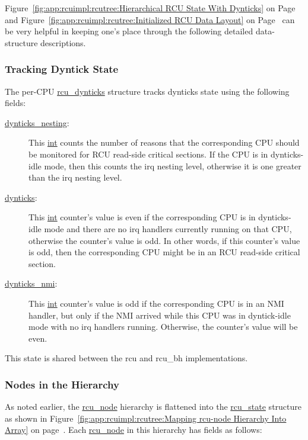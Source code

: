 Figure~\ref{fig:app:rcuimpl:rcutree:Hierarchical RCU State With Dynticks}
on
Page~\pageref{fig:app:rcuimpl:rcutree:Hierarchical RCU State With Dynticks}
and
Figure~\ref{fig:app:rcuimpl:rcutree:Initialized RCU Data Layout}
on
Page~\pageref{fig:app:rcuimpl:rcutree:Initialized RCU Data Layout}
can be very helpful in keeping one's place through the following detailed
data-structure descriptions.

\subsubsection{Tracking Dyntick State}
\label{app:rcuimpl:rcutreewt:Tracking Dyntick State}

The per-CPU \url{rcu_dynticks} structure tracks dynticks state using the
following fields:

\begin{description}
\item[\url{dynticks_nesting}:]
	This \url{int} counts the number of reasons that the corresponding
	CPU should be monitored for RCU read-side critical sections.
	If the CPU is in dynticks-idle mode, then this counts the
	irq nesting level, otherwise it is one greater than the
	irq nesting level.
\item[\url{dynticks}:]
	This \url{int} counter's value is even if the corresponding CPU is
	in dynticks-idle mode and there are no irq handlers currently
	running on that CPU, otherwise the counter's value is odd.
	In other words, if this counter's value is odd, then the
	corresponding CPU might be in an RCU read-side critical section.
\item[\url{dynticks_nmi}:]
	This \url{int} counter's value is odd if the corresponding CPU is
	in an NMI handler, but only if the NMI arrived while this
	CPU was in dyntick-idle mode with no irq handlers running.
	Otherwise, the counter's value will be even.
\end{description}

This state is shared between the rcu and rcu\_bh implementations.

\subsubsection{Nodes in the Hierarchy}
\label{app:rcuimpl:rcutreewt:Nodes in the Hierarchy}

As noted earlier, the \url{rcu_node} hierarchy is flattened into
the \url{rcu_state} structure as shown in
Figure~\ref{fig:app:rcuimpl:rcutree:Mapping rcu-node Hierarchy Into Array}
on
page~\pageref{fig:app:rcuimpl:rcutree:Mapping rcu-node Hierarchy Into Array}.
Each \url{rcu_node} in this hierarchy has fields as follows:

